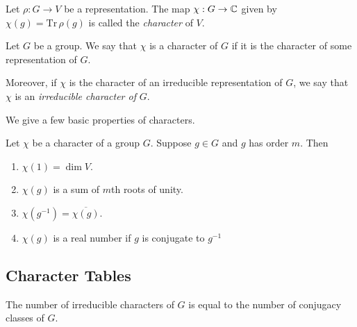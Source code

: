 

\begin{definition}
    Let $\rho : G \rightarrow V$ be a representation. The map $\chi : G \rightarrow \mathbb{C}$ given by $\chi(g) = 
    \text{Tr}\,\rho(g)$ is called the \emph{character} of $V$.
\end{definition}

\begin{definition}
    Let $G$ be a group. We say that $\chi$ is a character of $G$ if it is the character of some representation of 
    $G$.

    Moreover, if $\chi$ is the character of an irreducible representation of $G$, we say that $\chi$ is an
    \emph{irreducible character of} $G$.
\end{definition}



We give a few basic properties of characters.
\begin{theorem}
    Let $\chi$ be a character of a group $G$. Suppose $g \in G$ and $g$ has order $m$. Then
    \begin{enumerate}
        \item $\chi(1) = \dim V$.
        \item $\chi(g)$ is a sum of $m$th roots of unity.
        \item $\chi(g^{-1}) = \overline{\chi(g)}$.
        \item $\chi(g)$ is a real number if $g$ is conjugate  to $g^{-1}$
    \end{enumerate}
\end{theorem}




\subsection{Character Tables}
    


\begin{theorem}
    The number of irreducible characters of $G$ is equal to the number of conjugacy classes of $G$.
\end{theorem}

